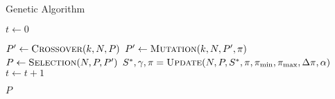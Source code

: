 \begin{algorithm}
  \caption{Genetic Algorithm}\label{alg:GENETIKUS_ALGORITMUS}
  \begin{algorithmic}[1]
    \State $t \leftarrow 0$
    \State {}

    \State $P' \leftarrow \Call{Crossover}{k, N, P}$
    \State $P' \leftarrow \Call{Mutation}{k, N, P', \pi}$
    \State $P \leftarrow \Call{Selection}{N, P, P'}$
    \State $S^{*}, \gamma, \pi = \Call{Update}{N, P, S^{*}, \pi, \pi_{\min}, \pi_{\max}, \Delta \pi, \alpha}$
    \State $t \leftarrow t + 1$
    \EndWhile

    \State \Return $P$
    \EndFunction
  \end{algorithmic}
\end{algorithm}

